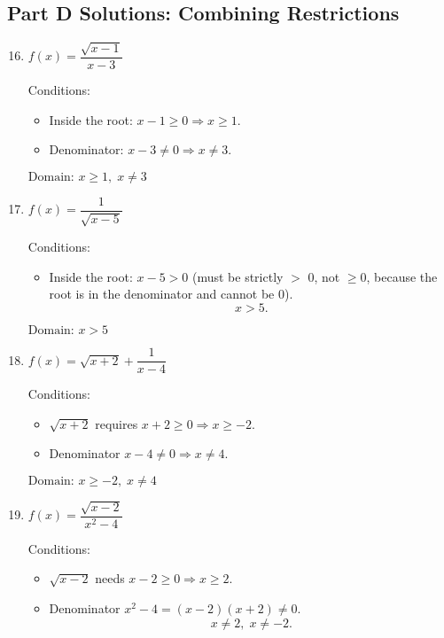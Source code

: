 \documentclass[12pt]{article}
\begin{document}
\subsection*{Part D Solutions: Combining Restrictions}
\begin{enumerate}
  \setcounter{enumi}{15}
  \item \(f(x) = \dfrac{\sqrt{x - 1}}{x - 3}\)

  Conditions:
  \begin{itemize}
    \item Inside the root: \(x - 1 \ge 0 \Rightarrow x \ge 1.\)
    \item Denominator: \(x - 3 \ne 0 \Rightarrow x \ne 3.\)
  \end{itemize}

  \(\boxed{\text{Domain: } x \ge 1,\; x \ne 3}\)

  \item \(f(x) = \dfrac{1}{\sqrt{x - 5}}\)

  Conditions:
  \begin{itemize}
    \item Inside the root: \(x - 5 > 0\) (must be strictly \(>\) 0, not \(\ge 0\), because the root is in the denominator and cannot be 0).
    \[
    x > 5.
    \]
  \end{itemize}

  \(\boxed{\text{Domain: } x > 5}\)

  \item \(f(x) = \sqrt{x + 2} + \dfrac{1}{x - 4}\)

  Conditions:
  \begin{itemize}
    \item \(\sqrt{x + 2}\) requires \(x + 2 \ge 0 \Rightarrow x \ge -2.\)
    \item Denominator \(x - 4 \ne 0 \Rightarrow x \ne 4.\)
  \end{itemize}

  \(\boxed{\text{Domain: } x \ge -2,\; x \ne 4}\)

  \item \(f(x) = \dfrac{\sqrt{x - 2}}{x^2 - 4}\)

  Conditions:
  \begin{itemize}
    \item \(\sqrt{x - 2}\) needs \(x - 2 \ge 0 \Rightarrow x \ge 2.\)
    \item Denominator \(x^2 - 4 = (x - 2)(x + 2) \ne 0.\)
    \[
    x \ne 2,\; x \ne -2.
    \]
  \end{itemize}


\end{enumerate}
\end{document}

